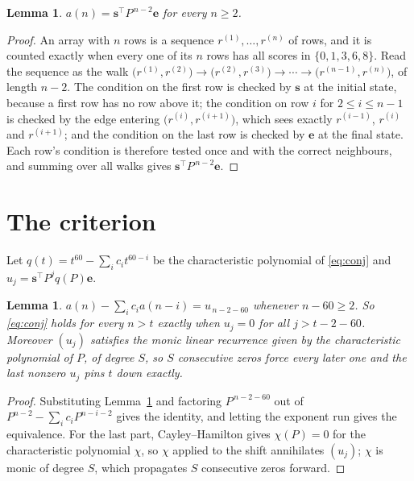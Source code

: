\documentclass[11pt,a4paper]{article}
\theoremstyle{plain}
\newtheorem{lemma}[theorem]{Lemma}
\theoremstyle{definition}
\begin{document}
\begin{lemma}\label{lem:walk}
$a(n)=\mathbf{s}^{\!\top}P^{\,n-2}\mathbf{e}$ for every $n\ge2$.
\end{lemma}

\begin{proof}
An array with $n$ rows is a sequence $r^{(1)},\dots,r^{(n)}$ of rows, and it is counted
exactly when every one of its $n$ rows has all scores in $\{0,1,3,6,8\}$. Read the sequence as the
walk $\bigl(r^{(1)},r^{(2)}\bigr)\to\bigl(r^{(2)},r^{(3)}\bigr)\to\cdots\to
\bigl(r^{(n-1)},r^{(n)}\bigr)$, of length $n-2$. The condition on the first row is
checked by $\mathbf{s}$ at the initial state, because a first row has no row above it; the
condition on row $i$ for $2\le i\le n-1$ is checked by the edge entering
$\bigl(r^{(i)},r^{(i+1)}\bigr)$, which sees exactly $r^{(i-1)}$, $r^{(i)}$ and
$r^{(i+1)}$; and the condition on the last row is checked by $\mathbf{e}$ at the final
state. Each row's condition is therefore tested once and with the correct neighbours, and
summing over all walks gives $\mathbf{s}^{\!\top}P^{\,n-2}\mathbf{e}$.
\end{proof}

\section{The criterion}

Let $q(t)=t^{60}-\sum_i c_i t^{60-i}$ be the characteristic polynomial of
\eqref{eq:conj} and $u_j=\mathbf{s}^{\!\top}P^{j}q(P)\mathbf{e}$.

\begin{lemma}\label{lem:crit}
$a(n)-\sum_i c_i a(n-i)=u_{\,n-2-60}$ whenever $n-60\ge2$. So \eqref{eq:conj}
holds for every $n>t$ exactly when $u_j=0$ for all $j>t-2-60$. Moreover $(u_j)$
satisfies the monic linear recurrence given by the characteristic polynomial of $P$, of
degree $S$, so $S$ consecutive zeros force every later one and the last nonzero $u_j$ pins
$t$ down exactly.
\end{lemma}

\begin{proof}
Substituting Lemma~\ref{lem:walk} and factoring $P^{\,n-2-60}$ out of
$P^{n-2}-\sum_i c_i P^{n-i-2}$ gives the identity, and letting the exponent run gives the
equivalence. For the last part, Cayley--Hamilton gives $\chi(P)=0$ for the characteristic
polynomial $\chi$, so $\chi$ applied to the shift annihilates $(u_j)$; $\chi$ is monic of
degree $S$, which propagates $S$ consecutive zeros forward.
\end{proof}
\end{document}
